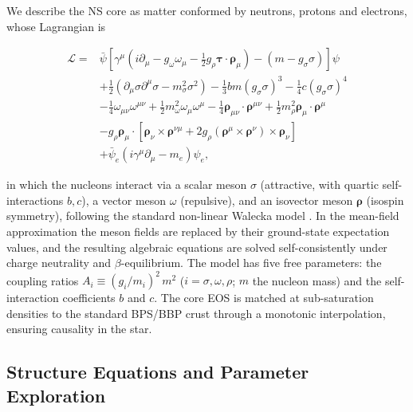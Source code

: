 \documentclass[10pt,letter,twoside]{rmat-rho}
\begin{document}
We describe the NS core as matter conformed by neutrons, protons and electrons, whose Lagrangian is

\begin{equation}
	\begin{aligned}
		\mathcal{L} = &\bar{\psi} \left[ \gamma^\mu \left( i\partial_\mu - g_{\omega} \omega_\mu - \frac{1}{2} g_{\rho} \boldsymbol{\tau} \cdot \boldsymbol{\rho}_\mu \right) - (m - g_{\sigma} \sigma) \right] \psi \\
		&+ \frac{1}{2} \left( \partial_\mu \sigma \partial^\mu \sigma - m_\sigma^2 \sigma^2 \right) - \frac{1}{3}bm (g_\sigma\sigma)^3 - \frac{1}{4}c(g_\sigma\sigma)^4 \\
		&- \frac{1}{4} \omega_{\mu\nu} \omega^{\mu\nu} + \frac{1}{2} m_\omega^2 \omega_\mu \omega^\mu - \frac{1}{4} \boldsymbol{\rho}_{\mu\nu} \cdot \boldsymbol{\rho}^{\mu\nu} + \frac{1}{2} m_\rho^2 \boldsymbol{\rho}_\mu \cdot \boldsymbol{\rho}^\mu \\
		&- g_\rho \boldsymbol{\rho}_\mu \cdot \left[ \boldsymbol{\rho}_\nu \times \boldsymbol{\rho}^{\nu\mu} + 2g_\rho \left(\boldsymbol{\rho}^\mu \times \boldsymbol{\rho}^\nu\right) \times \boldsymbol{\rho}_\nu \right] \\
		&+ \bar{\psi}_e \left( i\gamma^\mu \partial_\mu - m_e \right) \psi_e,
	\end{aligned}
	\label{eq:lagrangian}
\end{equation}

\noindent in which the nucleons interact via a scalar meson $\sigma$ (attractive, with quartic self-interactions $b,c$), a vector meson $\omega$ (repulsive), and an isovector meson $\boldsymbol{\rho}$ (isospin symmetry), following the standard non-linear Walecka model \citep{waleckaTheoryHighlyCondensed1974, glendenningCompactStarsNuclear2000}. In the mean-field approximation the meson fields are replaced by their ground-state expectation values, and the resulting algebraic equations are solved self-consistently under charge neutrality and $\beta$-equilibrium. The model has five free parameters: the coupling ratios $A_i \equiv (g_i/m_i)^2\,m^2$ ($i=\sigma,\omega,\rho$; $m$ the nucleon mass) and the self-interaction coefficients $b$ and $c$. The core EOS is matched at sub-saturation densities to the standard BPS/BBP crust through a monotonic interpolation, ensuring causality in the star.

\subsection{Structure Equations and Parameter Exploration}
\end{document}
